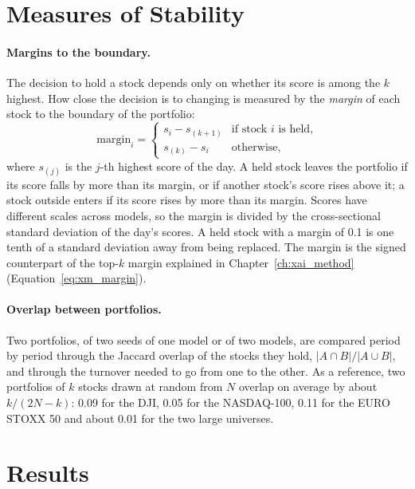 \section{Measures of Stability}
\label{sec:pf_fragility}

\paragraph{Margins to the boundary.} The decision to hold a stock depends only on whether its score is among the $k$ highest. How close the decision is to changing is measured by the \emph{margin} of each stock to the boundary of the portfolio:
\begin{equation}
    \label{eq:pf_margin}
    \text{margin}_i = \begin{cases} s_i - s_{(k+1)} & \text{if stock } i \text{ is held,} \\ s_{(k)} - s_i & \text{otherwise,} \end{cases}
\end{equation}
where $s_{(j)}$ is the $j$-th highest score of the day. A held stock leaves the portfolio if its score falls by more than its margin, or if another stock's score rises above it; a stock outside enters if its score rises by more than its margin. Scores have different scales across models, so the margin is divided by the cross-sectional standard deviation of the day's scores. A held stock with a margin of 0.1 is one tenth of a standard deviation away from being replaced. The margin is the signed counterpart of the top-$k$ margin explained in Chapter~\ref{ch:xai_method} (Equation~\ref{eq:xm_margin}).

\paragraph{Overlap between portfolios.} Two portfolios, of two seeds of one model or of two models, are compared period by period through the Jaccard overlap of the stocks they hold, $|A \cap B| / |A \cup B|$, and through the turnover needed to go from one to the other. As a reference, two portfolios of $k$ stocks drawn at random from $N$ overlap on average by about $k / (2N - k)$: 0.09 for the DJI, 0.05 for the NASDAQ-100, 0.11 for the EURO STOXX 50 and about 0.01 for the two large universes.

\section{Results}
\label{sec:pf_results}


